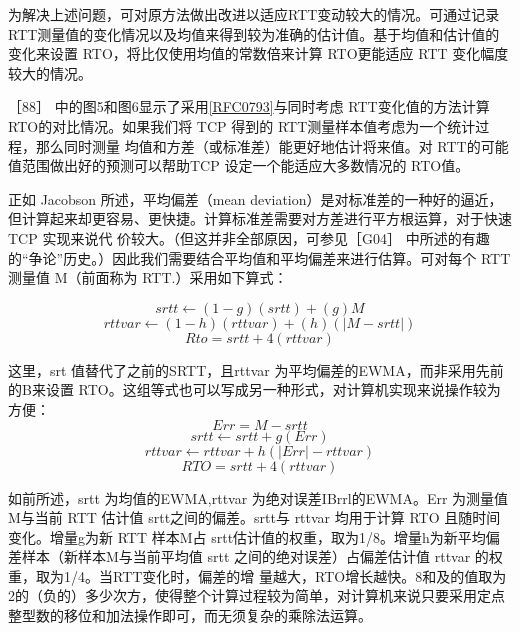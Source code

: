 为解决上述问题，可对原方法做出改进以适应RTT变动较大的情况。可通过记录 RTT测量值的变化情况以及均值来得到较为准确的估计值。基于均值和估计值的变化来设置
RTO，将比仅使用均值的常数倍来计算 RTO更能适应 RTT 变化幅度较大的情况。

［88］
中的图5和图6显示了采用\href{https://www.rfc-editor.org/rfc/rfc0793}{[RFC0793]}与同时考虑
RTT变化值的方法计算 RTO的对比情况。如果我们将 TCP 得到的 RTT测量样本值考虑为一个统计过程，那么同时测量
均值和方差（或标准差）能更好地估计将来值。对 RTT的可能值范围做出好的预测可以帮助TCP 设定一个能适应大多数情况的 RTO值。

正如 Jacobson 所述，平均偏差（mean
deviation）是对标准差的一种好的逼近，但计算起来却更容易、更快捷。计算标准差需要对方差进行平方根运算，对于快速 TCP 实现来说代
价较大。（但这并非全部原因，可参见［G04］ 中所述的有趣的“争论”历史。）因此我们需要结合平均值和平均偏差来进行估算。可对每个 RTT
测量值 M（前面称为 RTT.）采用如下算式：

\begin{equation}
  srtt \leftarrow (1-g)(srtt) + (g)M
\end{equation}
\begin{equation}
  rttvar \leftarrow (1-h)(rttvar) + (h)(|M-srtt|)
\end{equation}
\begin{equation}
  Rto = srtt + 4(rttvar)
\end{equation}

这里，srt 值替代了之前的SRTT，且rttvar 为平均偏差的EWMA，而非采用先前的B来设置
RTO。这组等式也可以写成另一种形式，对计算机实现来说操作较为方便：
\begin{equation}
  Err = M - srtt
\end{equation}
\begin{equation}
  srtt \leftarrow srtt + g(Err)
\end{equation}
\begin{equation}
  rttvar \leftarrow rttvar + h(|Err| - rttvar)
\end{equation}
\begin{equation}
  RTO = srtt + 4(rttvar)
\end{equation}

如前所述，srtt 为均值的EWMA,rttvar 为绝对误差IBrrl的EWMA。Err 为测量值 M与当前 RTT 估计值
srtt之间的偏差。srtt与 rttvar 均用于计算 RTO 且随时间变化。增量g为新
RTT 样本M占 srtt估计值的权重，取为1/8。增量h为新平均偏差样本（新样本M与当前平均值 srtt 之间的绝对误差）占偏差估计值
rttvar 的权重，取为1/4。当RTT变化时，偏差的增
量越大，RTO增长越快。8和及的值取为2的（负的）多少次方，使得整个计算过程较为简单，对计算机来说只要采用定点整型数的移位和加法操作即可，而无须复杂的乘除法运算。

